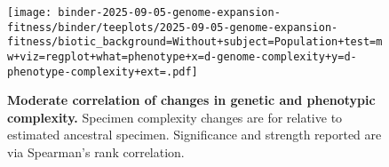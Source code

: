 \begin{figure}
\centering
\texttt{[image: binder-2025-09-05-genome-expansion-fitness/binder/teeplots/2025-09-05-genome-expansion-fitness/biotic\_background=Without+subject=Population+test=mw+viz=regplot+what=phenotype+x=d-genome-complexity+y=d-phenotype-complexity+ext=.pdf]}
\caption{%
\textbf{Moderate correlation of changes in genetic and phenotypic complexity.}
\footnotesize
Specimen complexity changes are for relative to estimated ancestral specimen.
Significance and strength reported are via Spearman's rank correlation.
}
\label{fig:gpcomplex-correlation}
\end{figure}
